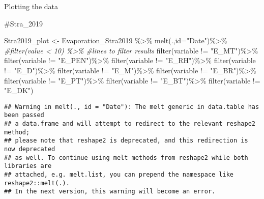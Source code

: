 \documentclass[
]{article}
\newenvironment{Shaded}{\begin{snugshade}}{\end{snugshade}}
\newcommand{\AttributeTok}[1]{\textcolor[rgb]{0.77,0.63,0.00}{#1}}
\newcommand{\CommentTok}[1]{\textcolor[rgb]{0.56,0.35,0.01}{\textit{#1}}}
\newcommand{\FunctionTok}[1]{\textcolor[rgb]{0.00,0.00,0.00}{#1}}
\newcommand{\NormalTok}[1]{#1}
\newcommand{\OtherTok}[1]{\textcolor[rgb]{0.56,0.35,0.01}{#1}}
\newcommand{\SpecialCharTok}[1]{\textcolor[rgb]{0.00,0.00,0.00}{#1}}
\newcommand{\StringTok}[1]{\textcolor[rgb]{0.31,0.60,0.02}{#1}}
\begin{document}
Plotting the data

\#Stra\_2019

\begin{Shaded}
\begin{Highlighting}[]
\NormalTok{Stra2019\_plot }\OtherTok{\textless{}{-}}\NormalTok{ Evaporation\_Stra2019 }\SpecialCharTok{\%\textgreater{}\%} 
 \FunctionTok{melt}\NormalTok{(.,}\AttributeTok{id=}\StringTok{"Date"}\NormalTok{)}\SpecialCharTok{\%\textgreater{}\%} 
  \CommentTok{\#filter(value \textless{} 10) \%\textgreater{}\%               \#lines to filter results}
  \FunctionTok{filter}\NormalTok{(variable }\SpecialCharTok{!=} \StringTok{"E\_MT"}\NormalTok{)}\SpecialCharTok{\%\textgreater{}\%}
  \FunctionTok{filter}\NormalTok{(variable }\SpecialCharTok{!=} \StringTok{"E\_PEN"}\NormalTok{)}\SpecialCharTok{\%\textgreater{}\%}
  \FunctionTok{filter}\NormalTok{(variable }\SpecialCharTok{!=} \StringTok{"E\_RH"}\NormalTok{)}\SpecialCharTok{\%\textgreater{}\%}
  \FunctionTok{filter}\NormalTok{(variable }\SpecialCharTok{!=} \StringTok{"E\_D"}\NormalTok{)}\SpecialCharTok{\%\textgreater{}\%}
  \FunctionTok{filter}\NormalTok{(variable }\SpecialCharTok{!=} \StringTok{"E\_M"}\NormalTok{)}\SpecialCharTok{\%\textgreater{}\%}
  \FunctionTok{filter}\NormalTok{(variable }\SpecialCharTok{!=} \StringTok{"E\_BR"}\NormalTok{)}\SpecialCharTok{\%\textgreater{}\%}
  \FunctionTok{filter}\NormalTok{(variable }\SpecialCharTok{!=} \StringTok{"E\_PT"}\NormalTok{)}\SpecialCharTok{\%\textgreater{}\%}
  \FunctionTok{filter}\NormalTok{(variable }\SpecialCharTok{!=} \StringTok{"E\_BT"}\NormalTok{)}\SpecialCharTok{\%\textgreater{}\%}
  \FunctionTok{filter}\NormalTok{(variable }\SpecialCharTok{!=} \StringTok{"E\_DK"}\NormalTok{)}
\end{Highlighting}
\end{Shaded}

\begin{verbatim}
## Warning in melt(., id = "Date"): The melt generic in data.table has been passed
## a data.frame and will attempt to redirect to the relevant reshape2 method;
## please note that reshape2 is deprecated, and this redirection is now deprecated
## as well. To continue using melt methods from reshape2 while both libraries are
## attached, e.g. melt.list, you can prepend the namespace like reshape2::melt(.).
## In the next version, this warning will become an error.
\end{verbatim}
\end{document}

